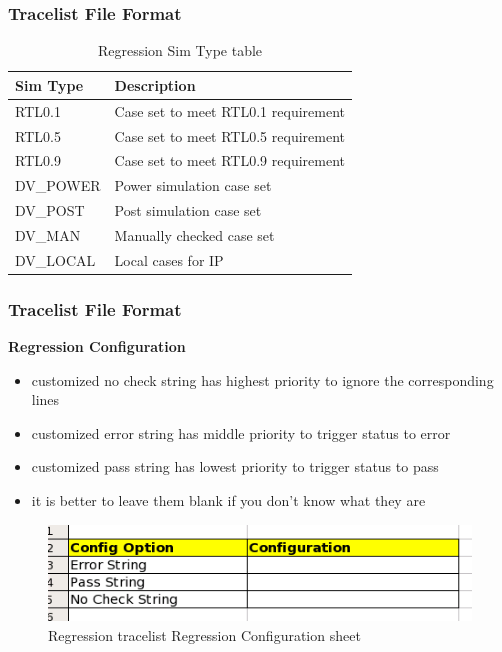 \documentclass{beamer}
\begin{document}

\begin{frame}
  \frametitle{Tracelist File Format}
  \begin{table}
    \begin{tabular}{ll}
      \toprule
      \textbf{Sim Type} & \textbf{Description}\\
      \midrule
      RTL0.1 & Case set to meet RTL0.1 requirement\\
      RTL0.5 & Case set to meet RTL0.5 requirement\\
      RTL0.9 & Case set to meet RTL0.9 requirement\\
      DV\_POWER & Power simulation case set\\
      DV\_POST & Post simulation case set\\
      DV\_MAN & Manually checked case set\\
      DV\_LOCAL & Local cases for IP\\
      \bottomrule
    \end{tabular}
    \caption{Regression Sim Type table}
  \end{table}
\end{frame}


\begin{frame}
  \frametitle{Tracelist File Format}
  \textbf{Regression Configuration}
  \begin{itemize}
  \item customized no check string has highest priority to ignore the corresponding lines
  \item customized error string has middle priority to trigger status to error
  \item customized pass string has lowest priority to trigger status to pass
  \item it is better to leave them blank if you don't know what they are
  \end{itemize}

  \begin{figure}
    \centering
    \includegraphics[width=0.5\linewidth]{rc_sheet}
    \caption{Regression tracelist Regression Configuration sheet}
  \end{figure}
\end{frame}
\end{document}
